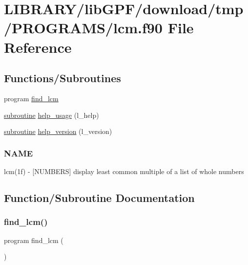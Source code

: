 \hypertarget{lcm_8f90}{}\section{L\+I\+B\+R\+A\+R\+Y/lib\+G\+P\+F/download/tmp/\+P\+R\+O\+G\+R\+A\+M\+S/lcm.f90 File Reference}
\label{lcm_8f90}
\subsection*{Functions/\+Subroutines}
\begin{DoxyCompactItemize}
\item 
program \hyperlink{lcm_8f90_a8e76ffedb6cca7be6b5cb9a55b5c5a46}{find\+\_\+lcm}
\item 
\hyperlink{M__stopwatch_83_8txt_acfbcff50169d691ff02d4a123ed70482}{subroutine} \hyperlink{lcm_8f90_a3e09a3b52ee8fb04eeb93fe5761626a8}{help\+\_\+usage} (l\+\_\+help)
\item 
\hyperlink{M__stopwatch_83_8txt_acfbcff50169d691ff02d4a123ed70482}{subroutine} \hyperlink{lcm_8f90_a39c21619b08a3c22f19e2306efd7f766}{help\+\_\+version} (l\+\_\+version)
\begin{DoxyCompactList}\small\item\em \subsubsection*{N\+A\+ME}

lcm(1f) -\/ \mbox{[}N\+U\+M\+B\+E\+RS\mbox{]} display least common multiple of a list of whole numbers \end{DoxyCompactList}\end{DoxyCompactItemize}


\subsection{Function/\+Subroutine Documentation}
\mbox{\label{lcm_8f90_a8e76ffedb6cca7be6b5cb9a55b5c5a46}} 
\subsubsection{\texorpdfstring{find\+\_\+lcm()}{find\_lcm()}}
{\footnotesize\ttfamily program find\+\_\+lcm (\begin{DoxyParamCaption}{ }\end{DoxyParamCaption})}



